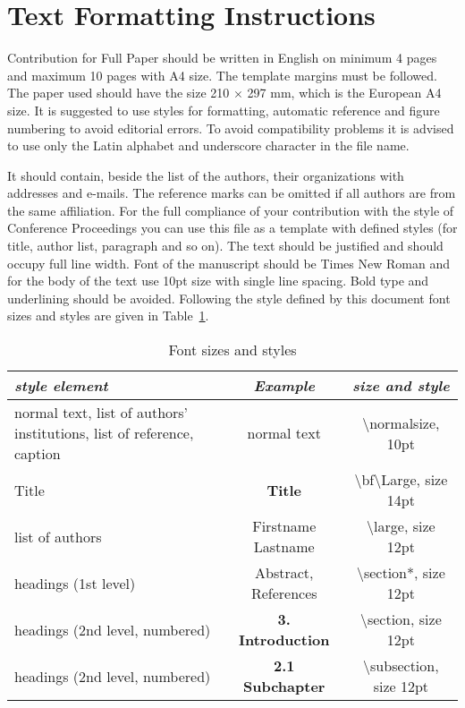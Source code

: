\documentclass{mbd_fullpaper}
\begin{document}
\section{Text Formatting Instructions}
Contribution for Full Paper should be written in English on minimum 4 pages and maximum 10 pages with A4 size. The template margins must be followed. The paper used should have the size 210 $\times$ 297 mm, which is the European A4 size. It is suggested to use styles for formatting, automatic reference and figure numbering to avoid editorial errors. To avoid compatibility problems it is advised to use only the Latin alphabet and underscore character in the file name.

It should contain, beside the list of the authors, their organizations with addresses and e-mails. The reference marks can be omitted if all authors are from the same affiliation.
For the full compliance of your contribution with the style of Conference Proceedings you can use this file as a template with defined styles (for title, author list, paragraph and so on). The text should be justified and should occupy full line width. Font of the manuscript should be Times New Roman and for the body of the text use 10pt size with single line spacing. Bold type and underlining should be avoided. Following the style defined by this document font sizes and styles are given in Table~\ref{tab:tab1}.

\renewcommand{\arraystretch}{1.5}

\begin{table}[!ht]
  \begin{center}
    \caption{Font sizes and styles}
    \vspace{1mm}
    \begin{tabular}{|p{5cm}|c|c|}
      \hline
        {\it style element}&	{\it Example}&	{\it size and style}\\
      \hline
      \hline
        normal text, list of authors' institutions, list of reference, caption &	normal text&	\textbackslash normalsize, 10pt\\
      \hline
        Title&	{\bf\Large Title}&	\textbackslash bf\textbackslash Large, size 14pt\\
      \hline
        list of authors&	{\large Firstname Lastname}&	\textbackslash large, size 12pt\\
      \hline
        headings (1st level)& {\large	Abstract, References}&	 \textbackslash section*, size 12pt\\
      \hline
        headings (2nd level, numbered)&	{\bf\large 3. Introduction}&	\textbackslash section, size 12pt\\
      \hline
        headings (2nd level, numbered)& {\bf\large 2.1 Subchapter}&	\textbackslash subsection, size 12pt\\
      \hline
    \end{tabular}
    \label{tab:tab1}
  \end{center}
\end{table}
\end{document}
